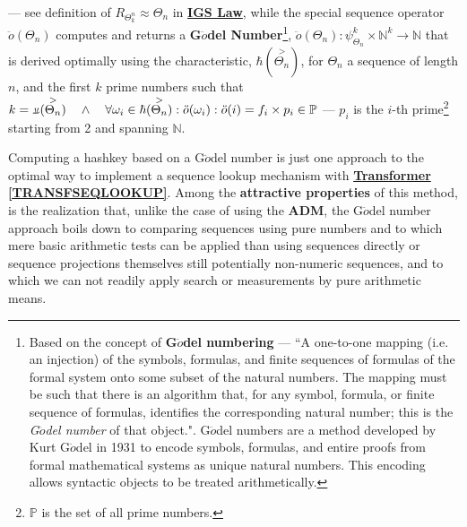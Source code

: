 \documentclass[a4paper, 18pt]{book} %
\newcommand{\invpi}{\rotatebox[origin=c]{180}{$\pi$}}
\begin{document}
 --- see definition of $R_{\Theta^n_k} \approx \Theta_n$ in \textbf{\hyperref[LAWGDL]{IGS Law}}, while the special sequence operator $\ddot{o}(\Theta_n)$ computes and returns a \textbf{G$\ddot{o}$del Number}\cite{illingworth1996computing}\footnote{Based on the concept of \textbf{G$\ddot{o}$del numbering} --- ``A one-to-one mapping (i.e. an injection) of the symbols, formulas, and finite sequences of formulas of the formal system onto some subset of the natural numbers. The mapping must be such that there is an algorithm that, for any symbol, formula, or finite sequence of formulas, identifies the corresponding natural number; this is the \textit{G$\ddot{o}$del number} of that object."\cite{illingworth1996computing}. G$\ddot{o}$del numbers are a method developed by Kurt G$\ddot{o}$del in 1931\cite{godel1931} to encode symbols, formulas, and entire proofs from formal mathematical systems as unique natural numbers. This encoding allows syntactic objects to be treated arithmetically\cite{godel1931english}.}, $\ddot{o}(\Theta_n): \psi_{\Theta_n}^k \times\mathbb{N}^k \rightarrow \mathbb{N}$ that is derived optimally using the characteristic, $\hbar(\overset{>}{\Theta_n})$, for $\Theta_n$ a sequence of length $n$, and the first $k$ prime numbers such that $k = \invpi(\overset{>}{\Theta_n}) \quad \land \quad \forall \omega_i \in \hbar(\overset{>}{\Theta_n}): \ddot{o}(\omega_i) : \ddot{o}(i) = f_i \times p_i \in \mathbb{P}$ --- $p_i$ is the $i$-th prime\footnote{$\mathbb{P}$ is the set of all prime numbers.} starting from 2 and spanning $\mathbb{N}$.
 
 Computing a hashkey based on a G$\ddot{o}$del number is just one approach to the optimal way to implement a sequence lookup mechanism with \textbf{\hyperref[TRANSFSEQLOOKUP]{Transformer \ref{TRANSFSEQLOOKUP}}}. Among the \textbf{attractive properties} of this method, is the realization that, unlike the case of using the \textbf{ADM}, the G$\ddot{o}$del number approach boils down to comparing sequences using pure numbers and to which mere basic arithmetic tests can be applied than using sequences directly or sequence projections themselves still potentially non-numeric sequences, and to which we can not readily apply search or measurements by pure arithmetic means.
 
\end{document}
